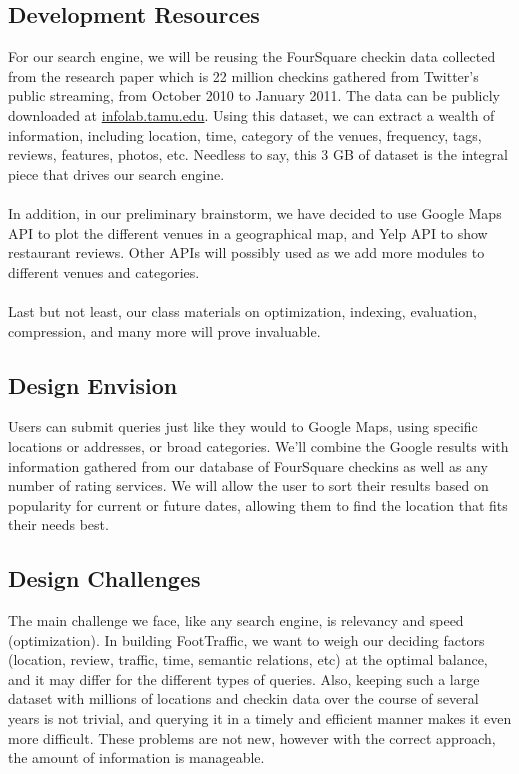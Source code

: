 \documentclass{article}
\begin{document}
\subsection{Development Resources}
For our search engine, we will be reusing the FourSquare checkin data collected from the research paper
which is 22 million checkins gathered from Twitter's public streaming, from October 2010 to January 2011. 
The data can be publicly downloaded at \href{http://infolab.tamu.edu/static/users/zhiyuan/icwsm_2011.zip}{infolab.tamu.edu}.
Using this dataset, we can extract a wealth of information, including location, time, category of the
venues, frequency, tags, reviews, features, photos, etc. Needless to say, this 3 GB of dataset is the
integral piece that drives our search engine.
\\ \\
In addition, in our preliminary brainstorm, we have decided to use Google Maps API to plot the different
venues in a geographical map, and Yelp API to show restaurant reviews. Other APIs will possibly used
as we add more modules to different venues and categories.
\\ \\
Last but not least, our class materials on optimization, indexing, evaluation, compression, and many more
will prove invaluable.
  
\subsection{Design Envision}
Users can submit queries just like they would to Google Maps, using specific locations or addresses,
or broad categories. We'll combine the Google results with information gathered from our database of
FourSquare checkins as well as any number of rating services. We will allow the user to sort their results
based on popularity for current or future dates, allowing them to find the location that fits their needs best.

\subsection{Design Challenges}
The main challenge we face, like any search engine, is relevancy and speed (optimization). In building FootTraffic,
we want to weigh our deciding factors (location, review, traffic, time, semantic relations, etc) at the optimal 
balance, and it may differ for the different types of queries. Also, keeping such a large dataset with millions
of locations and checkin data over the course of several years is not trivial, and querying it in a timely and
efficient manner makes it even more difficult. These problems are not new, however with the correct approach,
the amount of information is manageable.
\end{document}
